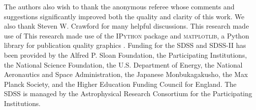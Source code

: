 \documentclass[apj, revtex4]{emulateapj}
\newcommand{\editorial}[1]{\textcolor{red}{#1}}
\begin{document}
\acknowledgments 
The authors also wish to thank the anonymous referee whose comments and suggestions significantly improved both the quality and clarity of this work. We also thank Steven W. Crawford for many helpful discussions. This research made use of This research made use of the \textsc{IPython} package \citep{Perez2007} and \textsc{matplotlib}, a Python library for publication quality graphics \citep{Hunter2007}. Funding for the SDSS and SDSS-II has been provided by the Alfred P. Sloan Foundation, the Participating Institutions, the National Science Foundation, the U.S. Department of Energy, the National Aeronautics and Space Administration, the Japanese Monbukagakusho, the Max Planck Society, and the Higher Education Funding Council for England. The SDSS is managed by the Astrophysical Research Consortium for the Participating Institutions.



\end{document}

